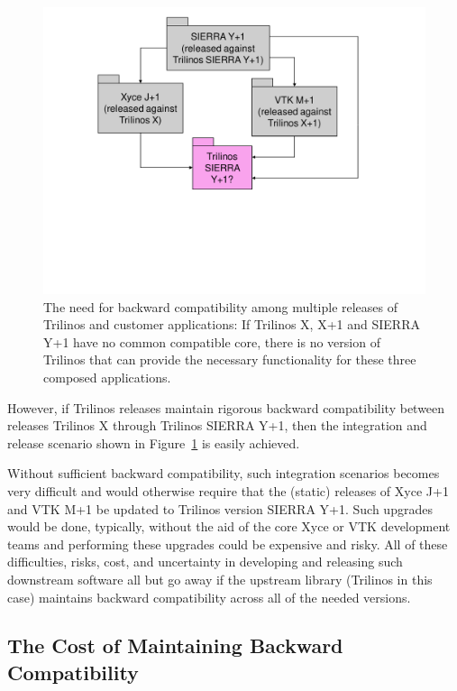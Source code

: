\documentclass[11pt]{SANDreport}
\begin{document}
\begin{figure}
\begin{center}
\includegraphics[trim = 1.0in 2.7in 1.0in 0.2in, scale=0.55]
{XyceSierraVtkTrilinosCompatibility}
\caption{
The need for backward compatibility among multiple releases of
Trilinos and customer applications: If Trilinos X, X+1 and SIERRA Y+1
have no common compatible core, there is no version of Trilinos that
can provide the necessary functionality for these three composed
applications.}
\label{fig:XyceSierraVtkTrilinosCompatibility}
\end{center}
\end{figure}

However, if Trilinos releases maintain rigorous backward compatibility
between releases Trilinos X through Trilinos SIERRA Y+1, then the
integration and release scenario shown in
Figure~\ref{fig:XyceSierraVtkTrilinosCompatibility} is easily
achieved.

Without sufficient backward compatibility, such integration scenarios
becomes very difficult and would otherwise require that the (static)
releases of Xyce J+1 and VTK M+1 be updated to Trilinos version SIERRA
Y+1.  Such upgrades would be done, typically, without the aid of the
core Xyce or VTK development teams and performing these upgrades could
be expensive and risky.  All of these difficulties, risks, cost, and
uncertainty in developing and releasing such downstream software all
but go away if the upstream library (Trilinos in this case) maintains
backward compatibility across all of the needed versions.


%
{}\subsection{The Cost of Maintaining Backward Compatibility}
\label{sec:costs_of_back_compat}
%
\end{document}
